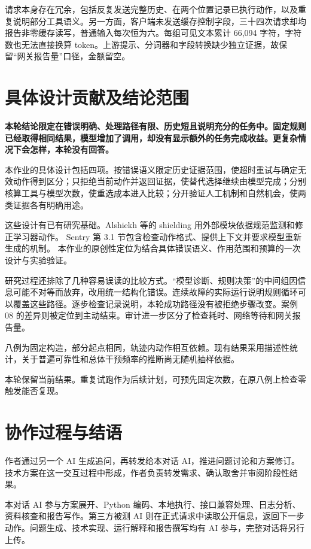 \documentclass[12pt,a4paper,UTF8,fontset=none]{ctexart}
\begin{document}
请求本身存在冗余，包括反复发送完整历史、在两个位置记录已执行动作，以及重复说明部分工具语义。另一方面，客户端未发送缓存控制字段，三十四次请求却均报告非零缓存读写，普通输入每次恒为六。每组可见文本累计 66,094 字符，字符数也无法直接换算 token。上游提示、分词器和字段转换缺少独立证据，故保留“网关报告量”口径，金额留空。


\section{具体设计贡献及结论范围}

\textbf{本轮结论限定在错误明确、处理路径有限、历史短且说明充分的任务中。固定规则已经取得相同结果，模型增加了调用，却没有显示额外的任务完成收益。更复杂情况下会怎样，本轮没有回答。}


本作业的具体设计包括四项。按错误语义限定历史证据范围，使超时重试与确定无效动作得到区分；只拒绝当前动作并返回证据，使替代选择继续由模型完成；分别核算工具与模型次数，使重选成本进入比较；分开验证人工机制和自然机会，使两类证据各有明确用途。


这些设计有已有研究基础。Alshiekh 等的 shielding 用外部模块依据规范监测和修正学习器动作。\cite{shield} Sentry 第 3.1 节包含检查动作格式、提供上下文并要求模型重新生成的机制。\cite{sentry} 本作业的原创性定位为结合具体错误语义、作用范围和预算的一次设计与实验验证。


研究过程还排除了几种容易误读的比较方式。“模型诊断、规则决策”的中间组因信息可能不对等而放弃，改用统一结构化错误。连续故障的实际运行说明规则循环可以覆盖这些路径。逐步检查记录说明，本轮成功路径没有被拒绝步骤改变。案例 08 的差异则被定位到主动结束。审计进一步区分了检查耗时、网络等待和网关报告量。


八例为固定构造，部分起点相同，轨迹内动作相互依赖。现有结果采用描述性统计，关于普遍可靠性和总体干预频率的推断尚无随机抽样依据。


本轮保留当前结果。重复试跑作为后续计划，可预先固定次数，在原八例上检查零触发能否复现。


\section{协作过程与结语}

作者通过另一个 AI 生成追问，再转发给本对话 AI，推进问题讨论和方案修订。技术方案在这一交互过程中形成，作者负责转发需求、确认取舍并审阅阶段性结果。


本对话 AI 参与方案展开、Python 编码、本地执行、接口兼容处理、日志分析、资料核查和报告写作。第三方被测 AI 则在正式请求中读取公开信息，返回下一步动作。问题生成、技术实现、运行解释和报告撰写均有 AI 参与，完整对话将另行上传。
\end{document}
